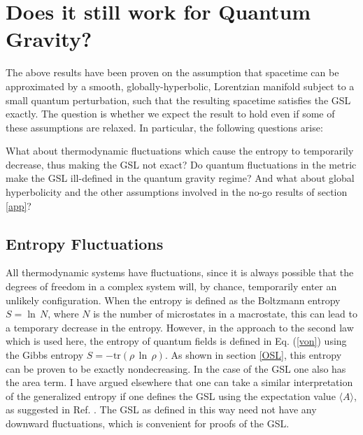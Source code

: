 \documentclass{article}
\begin{document}
\section{Does it still work for Quantum Gravity?}\label{QG}

The above results have been proven on the assumption that spacetime can be approximated by a smooth, globally-hyperbolic, Lorentzian manifold subject to a small quantum perturbation, such that the resulting spacetime satisfies the GSL exactly.  The question is whether we expect the result to hold even if some of these assumptions are relaxed.  In particular, the following questions arise:

What about thermodynamic fluctuations which cause the entropy to temporarily decrease, thus making the GSL not exact?  Do quantum fluctuations in the metric make the GSL ill-defined in the quantum gravity regime?  And what about global hyperbolicity and the other assumptions involved in the no-go results of section \ref{app}?

\subsection{Entropy Fluctuations}\label{entfluc}

All thermodynamic systems have fluctuations, since it is always possible that the degrees of freedom in a complex system will, by chance, temporarily enter an unlikely configuration.  When the entropy is defined as the Boltzmann entropy $S = \ln\,N$, where $N$ is the number of microstates in a macrostate, this can lead to a temporary decrease in the entropy.  However, in the approach to the second law which is used here, the entropy of quantum fields is defined in Eq. (\ref{von}) using the Gibbs entropy $S = -\mathrm{tr}(\rho\,\ln\,\rho)$.  As shown in section \ref{OSL}, this entropy can be proven to be exactly nondecreasing.  In the case of the GSL one also has the area term.  I have argued elsewhere \cite{10proofs} that one can take a similar interpretation of the generalized entropy if one defines the GSL using the expectation value $\langle A \rangle$, as suggested in Ref. \cite{fluct}.  The GSL as defined in this way need not have any downward fluctuations, which is convenient for proofs of the GSL.
\end{document}
